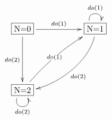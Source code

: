 $\xymatrix{
   \fbox{N=0} \ar[rr]^{do(1)} \ar[dd]_{do(2)} && \fbox{N=1} \ar@(ul,ur)^{do(1)} \ar@(d,r)[ddll]^{do(2)} \\ \\
   \fbox{N=2} \ar@/^/[uurr]|-{do(1)} \ar@(dl,dr)[]_{do(2)}}$
